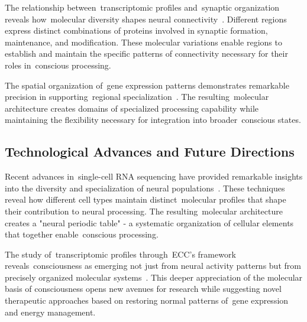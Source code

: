 The relationship between~transcriptomic profiles and~synaptic organization reveals how~molecular diversity shapes neural connectivity~\cite{Angulo2022, Fulcher2019}. Different regions express distinct combinations of proteins involved in synaptic formation, maintenance, and modification. These molecular variations enable regions to establish and maintain the specific patterns of connectivity necessary for their roles in~conscious processing.

The spatial organization of~gene expression patterns demonstrates remarkable precision in supporting~regional specialization~\cite{Zeng2017, Hawrylycz2012}. The resulting~molecular architecture creates domains of specialized processing capability while maintaining the flexibility necessary for integration into broader~conscious states.

\subsection*{Technological Advances and Future Directions~}

Recent advances in~single-cell RNA sequencing have provided remarkable insights into the diversity and specialization of neural populations~\cite{Lake2016, Zeng2017}. These techniques reveal how different cell types maintain distinct~molecular profiles that shape their contribution to neural processing. The resulting~molecular architecture creates a "neural periodic table" - a systematic organization of cellular elements that together enable~conscious processing.

The study of~transcriptomic profiles through~ECC's framework reveals~consciousness as emerging not just from neural activity patterns but from precisely organized molecular systems~\cite{Zeng2017, butlin2023consciousnessartificialintelligenceinsights}. This deeper appreciation of the molecular basis of consciousness opens new avenues for research while suggesting novel therapeutic approaches based on restoring normal patterns of~gene expression and energy management.

